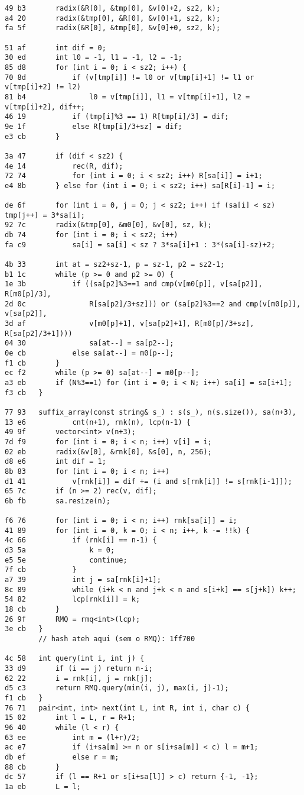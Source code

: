 \documentclass[11pt, a4paper, twoside]{article}
\begin{document}
\begin{lstlisting}
49 b3 		radix(&R[0], &tmp[0], &v[0]+2, sz2, k);
a4 20 		radix(&tmp[0], &R[0], &v[0]+1, sz2, k);
fa 5f 		radix(&R[0], &tmp[0], &v[0]+0, sz2, k);
      
51 af 		int dif = 0;
30 ed 		int l0 = -1, l1 = -1, l2 = -1;
85 d8 		for (int i = 0; i < sz2; i++) {
70 8d 			if (v[tmp[i]] != l0 or v[tmp[i]+1] != l1 or v[tmp[i]+2] != l2)
81 b4 				l0 = v[tmp[i]], l1 = v[tmp[i]+1], l2 = v[tmp[i]+2], dif++;
46 19 			if (tmp[i]%3 == 1) R[tmp[i]/3] = dif;
9e 1f 			else R[tmp[i]/3+sz] = dif;
e3 cb 		}
      
3a 47 		if (dif < sz2) {
4e 14 			rec(R, dif);
72 74 			for (int i = 0; i < sz2; i++) R[sa[i]] = i+1;
e4 8b 		} else for (int i = 0; i < sz2; i++) sa[R[i]-1] = i;
      
de 6f 		for (int i = 0, j = 0; j < sz2; i++) if (sa[i] < sz) tmp[j++] = 3*sa[i];
92 7c 		radix(&tmp[0], &m0[0], &v[0], sz, k);
db 74 		for (int i = 0; i < sz2; i++)
fa c9 			sa[i] = sa[i] < sz ? 3*sa[i]+1 : 3*(sa[i]-sz)+2;
      
4b 33 		int at = sz2+sz-1, p = sz-1, p2 = sz2-1;
b1 1c 		while (p >= 0 and p2 >= 0) {
1e 3b 			if ((sa[p2]%3==1 and cmp(v[m0[p]], v[sa[p2]], R[m0[p]/3],
2d 0c 				R[sa[p2]/3+sz])) or (sa[p2]%3==2 and cmp(v[m0[p]], v[sa[p2]],
3d af 				v[m0[p]+1], v[sa[p2]+1], R[m0[p]/3+sz], R[sa[p2]/3+1])))
04 30 				sa[at--] = sa[p2--];
0e cb 			else sa[at--] = m0[p--];
f1 cb 		}
ec f2 		while (p >= 0) sa[at--] = m0[p--];
a3 eb 		if (N%3==1) for (int i = 0; i < N; i++) sa[i] = sa[i+1];
f3 cb 	}
      
77 93 	suffix_array(const string& s_) : s(s_), n(s.size()), sa(n+3),
13 e6 			cnt(n+1), rnk(n), lcp(n-1) {
49 9f 		vector<int> v(n+3);
7d f9 		for (int i = 0; i < n; i++) v[i] = i;
02 eb 		radix(&v[0], &rnk[0], &s[0], n, 256);
d8 e6 		int dif = 1;
8b 83 		for (int i = 0; i < n; i++)
d1 41 			v[rnk[i]] = dif += (i and s[rnk[i]] != s[rnk[i-1]]);
65 7c 		if (n >= 2) rec(v, dif);
6b fb 		sa.resize(n);
      
f6 76 		for (int i = 0; i < n; i++) rnk[sa[i]] = i;
41 89 		for (int i = 0, k = 0; i < n; i++, k -= !!k) {
4c 66 			if (rnk[i] == n-1) {
d3 5a 				k = 0;
e5 5e 				continue;
7f cb 			}
a7 39 			int j = sa[rnk[i]+1];
8c 89 			while (i+k < n and j+k < n and s[i+k] == s[j+k]) k++;
54 82 			lcp[rnk[i]] = k;
18 cb 		}
26 9f 		RMQ = rmq<int>(lcp);
3e cb 	}
      	// hash ateh aqui (sem o RMQ): 1ff700
      
4c 58 	int query(int i, int j) {
33 d9 		if (i == j) return n-i;
62 22 		i = rnk[i], j = rnk[j];
d5 c3 		return RMQ.query(min(i, j), max(i, j)-1);
f1 cb 	}
76 71 	pair<int, int> next(int L, int R, int i, char c) {
15 02 		int l = L, r = R+1;
96 40 		while (l < r) {
63 ee 			int m = (l+r)/2;
ac e7 			if (i+sa[m] >= n or s[i+sa[m]] < c) l = m+1;
db ef 			else r = m;
88 cb 		}
dc 57 		if (l == R+1 or s[i+sa[l]] > c) return {-1, -1};
1a eb 		L = l;
      

\end{lstlisting}
\end{document}
